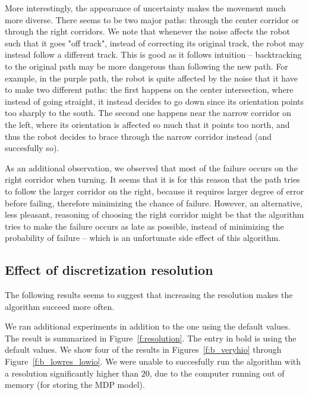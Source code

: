 \documentclass[a4paper]{article}
\begin{document}
More interestingly, the appearance of uncertainty makes the movement much more
diverse. There seems to be two major paths: through the center corridor or
through the right corridors. We note that whenever the noise affects the robot
such that it goes "off track", instead of correcting its original track, the
robot may instead follow a different track. This is good as it follows
intuition -- backtracking to the original path may be more dangerous
than following the new path. For example, in the purple path, the robot is
quite affected by the noise that it have to make two different paths: the first
happens on the center intersection, where instead of going straight, it instead
decides to go down since its orientation points too sharply to the south. The
second one happens near the narrow corridor on the left, where its orientation
is affected so much that it points too north, and thus the robot decides to
brace through the narrow corridor instead (and succesfully so).

As an additional observation, we observed that most of the failure occurs on the
right corridor when turning. It seems that it is for this reason that the path
tries to follow the larger corridor on the right, because it requires larger degree
of error before failing, therefore minimizing the chance of failure. However,
an alternative, less pleasant, reasoning of choosing the right corridor might
be that the algorithm tries to make the failure occurs as late as possible,
instead of minimizing the probability of failure -- which is an unfortunate side
effect of this algorithm.

\subsection{Effect of discretization resolution}
The following results seems to suggest that increasing the resolution makes the algorithm
succeed more often.

We ran additional experiments in addition to the one using the default
values. The result is summarized in Figure~\ref{f:resolution}.
The entry in bold is using the default values.
We show four of the results in Figures~\ref{f:b_veryhio} through
Figure~\ref{f:b_lowres_lowio}.
We were unable
to succesfully run the algorithm with a resolution significantly higher than
$20$, due to the computer running out of memory (for storing the MDP model).
\end{document}
